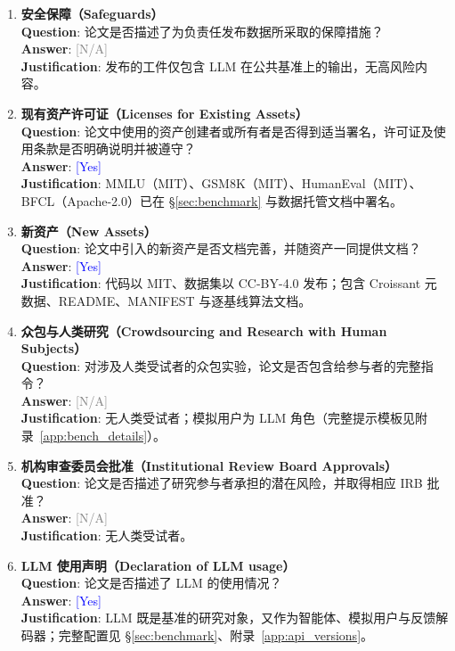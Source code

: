 \documentclass[11pt,a4paper,fontset=fandol]{ctexart}
\newcommand{\answerYes}[1][]{\textcolor{blue}{[Yes]#1}}
\newcommand{\answerNA}[1][]{\textcolor{gray}{[N/A]#1}}
\begin{document}
\begin{enumerate}
\item {\bf 安全保障（Safeguards）}\\
\textbf{Question}: 论文是否描述了为负责任发布数据所采取的保障措施？\\
\textbf{Answer}: \answerNA{}\\
\textbf{Justification}: 发布的工件仅包含 LLM 在公共基准上的输出，无高风险内容。

\item {\bf 现有资产许可证（Licenses for Existing Assets）}\\
\textbf{Question}: 论文中使用的资产创建者或所有者是否得到适当署名，许可证及使用条款是否明确说明并被遵守？\\
\textbf{Answer}: \answerYes{}\\
\textbf{Justification}: MMLU（MIT）、GSM8K（MIT）、HumanEval（MIT）、BFCL（Apache-2.0）已在 \S\ref{sec:benchmark} 与数据托管文档中署名。

\item {\bf 新资产（New Assets）}\\
\textbf{Question}: 论文中引入的新资产是否文档完善，并随资产一同提供文档？\\
\textbf{Answer}: \answerYes{}\\
\textbf{Justification}: 代码以 MIT、数据集以 CC-BY-4.0 发布；包含 Croissant 元数据、README、MANIFEST 与逐基线算法文档。

\item {\bf 众包与人类研究（Crowdsourcing and Research with Human Subjects）}\\
\textbf{Question}: 对涉及人类受试者的众包实验，论文是否包含给参与者的完整指令？\\
\textbf{Answer}: \answerNA{}\\
\textbf{Justification}: 无人类受试者；模拟用户为 LLM 角色（完整提示模板见附录~\ref{app:bench_details}）。

\item {\bf 机构审查委员会批准（Institutional Review Board Approvals）}\\
\textbf{Question}: 论文是否描述了研究参与者承担的潜在风险，并取得相应 IRB 批准？\\
\textbf{Answer}: \answerNA{}\\
\textbf{Justification}: 无人类受试者。

\item {\bf LLM 使用声明（Declaration of LLM usage）}\\
\textbf{Question}: 论文是否描述了 LLM 的使用情况？\\
\textbf{Answer}: \answerYes{}\\
\textbf{Justification}: LLM 既是基准的研究对象，又作为智能体、模拟用户与反馈解码器；完整配置见 \S\ref{sec:benchmark}、附录~\ref{app:api_versions}。
\end{enumerate}
\end{document}
